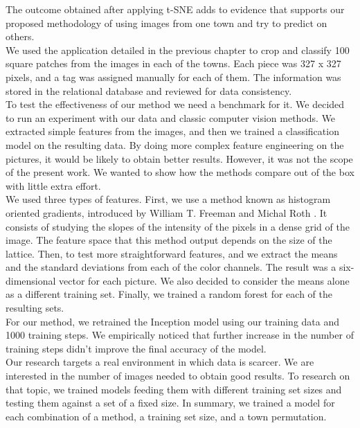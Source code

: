 The outcome obtained after applying t-SNE adds to evidence that supports our proposed methodology of using images from one town and try to predict on others.\\

We used the application detailed in the previous chapter to crop and classify 100 square patches from the images in each of the towns. Each piece was 327 x 327 pixels, and a tag was assigned manually for each of them. The information was stored in the relational database and reviewed for data consistency.\\


To test the effectiveness of our method we need a benchmark for it. We decided to run an experiment with our data and classic computer vision methods. We extracted simple features from the images, and then we trained a classification model on the resulting data. By doing more complex feature engineering on the pictures, it would be likely to obtain better results. However, it was not the scope of the present work. We wanted to show how the methods compare out of the box with little extra effort.\\

We used three types of features. First, we use a method known as histogram oriented gradients, introduced by William T. Freeman and Michal Roth \cite{MERL_TR94-03}. It consists of studying the slopes of the intensity of the pixels in a dense grid of the image. The feature space that this method output depends on the size of the lattice. Then, to test more straightforward features, and we extract the means and the standard deviations from each of the color channels. The result was a six-dimensional vector for each picture. We also decided to consider the means alone as a different training set. Finally, we trained a random forest for each of the resulting sets.\\

For our method, we retrained the Inception model using our training data and 1000 training steps. We empirically noticed that further increase in the number of training steps didn't improve the final accuracy of the model.\\

Our research targets a real environment in which data is scarcer. We are interested in the number of images needed to obtain good results. To research on that topic, we trained models feeding them with different training set sizes and testing them against a set of a fixed size. In summary, we trained a model for each combination of a method, a training set size, and a town permutation.\\



